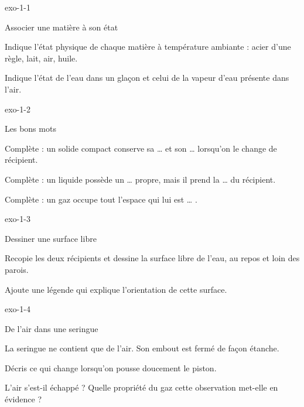 \documentclass[12pt,twoside,openany]{book}
\begin{document}
\clearpage{}
\begin{blocLivre}{exo-1-1}
\begin{exercice}[1]{Associer une matière à son état}
\begin{questions}
\item Indique l’état physique de chaque matière à température ambiante : acier d’une règle, lait, air, huile.
\item Indique l’état de l’eau dans un glaçon et celui de la vapeur d’eau présente dans l’air.
\end{questions}
\end{exercice}\end{blocLivre}
\begin{blocLivre}{exo-1-2}
\begin{exercice}[1]{Les bons mots}
\begin{questions}
\item Complète : un solide compact conserve sa … et son … lorsqu’on le change de récipient.
\item Complète : un liquide possède un … propre, mais il prend la … du récipient.
\item Complète : un gaz occupe tout l’espace qui lui est … .
\end{questions}
\end{exercice}\end{blocLivre}
\begin{blocLivre}{exo-1-3}
\begin{exercice}[1]{Dessiner une surface libre}
\begin{questions}
\item Recopie les deux récipients et dessine la surface libre de l’eau, au repos et loin des parois.
\item Ajoute une légende qui explique l’orientation de cette surface.
\end{questions}
\end{exercice}\end{blocLivre}
\begin{blocLivre}{exo-1-4}
\begin{exercice}[1]{De l’air dans une seringue}
\begin{donnees}La seringue ne contient que de l’air. Son embout est fermé de façon étanche.\par
\end{donnees}
\begin{questions}
\item Décris ce qui change lorsqu’on pousse doucement le piston.
\item L’air s’est-il échappé ? Quelle propriété du gaz cette observation met-elle en évidence ?
\end{questions}
\end{exercice}\end{blocLivre}
\end{document}
